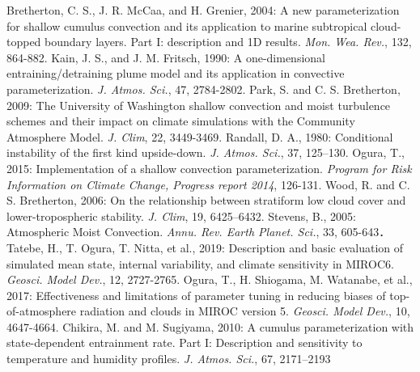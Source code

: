 \begin{thebibliography}{99}
     Bretherton, C. S., J. R. McCaa, and H. Grenier, 2004: 
        A new parameterization for shallow cumulus convection and its application to marine subtropical cloud-topped boundary layers. Part I: description and 1D results. 
        \textit{Mon. Wea. Rev.}, 132, 864-882.
     Kain, J. S., and J. M. Fritsch, 1990: 
        A one-dimensional entraining/detraining plume model and its application in convective parameterization.
        \textit{J. Atmos. Sci.}, 47, 2784-2802.
     Park, S. and C. S. Bretherton, 2009: 
        The University of Washington shallow convection and moist turbulence schemes and their impact on 
        climate simulations with the Community Atmosphere Model. \textit{J. Clim}, 22, 3449-3469.
     Randall, D. A., 1980: 
        Conditional instability of the first kind upside-down. \textit{J. Atmos. Sci.}, 37, 125–130.
     Ogura, T., 2015: 
        Implementation of a shallow convection parameterization. \textit{Program for Risk Information on Climate Change, 
        Progress report 2014}, 126-131.
     Wood, R. and C. S. Bretherton, 2006: 
        On the relationship between stratiform low cloud cover and lower-tropospheric stability. 
        \textit{J. Clim}, 19, 6425–6432.
     Stevens, B., 2005: 
        Atmospheric Moist Convection. \textit{Annu. Rev. Earth Planet. Sci.}, 33, 605-643．
     Tatebe, H., T. Ogura, T. Nitta, et al., 2019: 
        Description and basic evaluation of simulated mean state, internal variability, and climate sensitivity in MIROC6.
        \textit{Geosci. Model Dev.}, 12, 2727-2765.
     Ogura, T., H. Shiogama, M. Watanabe, et al., 2017:
        Effectiveness and limitations of parameter tuning in reducing biases of top-of-atmosphere radiation and clouds in MIROC version 5.
        \textit{Geosci. Model Dev.}, 10, 4647-4664.
    Chikira, M. and M. Sugiyama, 2010: 
        A cumulus parameterization with state-dependent entrainment rate. Part I: Description and sensitivity to temperature and humidity profiles.
        \textit{J. Atmos. Sci.}, 67, 2171–2193
\end{thebibliography}
